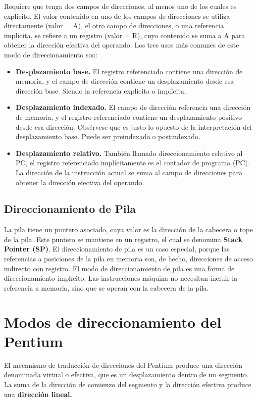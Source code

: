 \documentclass{article}
\begin{document}
Requiere que tenga dos campos de direcciones, al menos uno de los cuales
es expl\'{i}cito. El valor contenido en uno de los campos de direcciones
se utiliza directamente (valor = A), el otro campo de direcciones, o una
referencia impl\'{i}cita, se refiere a un registro (valor = R), cuyo contenido
se suma a A para obtener la direcci\'{o}n efectiva del operando. Los tres usos
m\'{a}s comunes de este modo de direccionamiento son:

\begin{itemize}
    \item \textbf{Desplazamiento base.}
          El registro referenciado contiene una direcci\'{o}n de memoria, y
          el campo de direcci\'{o}n contiene un desplazamiento desde esa
          direcci\'{o}n base. Siendo la referencia expl\'{i}cita o impl\'{i}cita.
    \item \textbf{Desplazamiento indexado.}
          El campo de direcci\'{o}n referencia una direcci\'{o}n de memoria,
          y el registro referenciado contiene un desplazamiento positivo desde
          esa direcci\'{o}n. Obs\'{e}rvese que es justo lo opuesto de la
          interpretaci\'{o}n del desplazamiento base. Puede ser preindexado o
          postindexado.
    \item \textbf{Desplazamiento relativo.}
          Tambi\'{e}n llamado direccionamiento relativo al PC, el registro
          referenciado impl\'{i}citamente es el contador de programa (PC).
          La direcci\'{o}n de la instrucci\'{o}n actual se suma al campo de
          direcciones para obtener la direcci\'{o}n efectiva del operando.
\end{itemize}

\subsection*{Direccionamiento de Pila}
La pila tiene un puntero asociado, cuya valor es la direcci\'{o}n de la cabecera
o tope de la pila. Este puntero se mantiene en un registro, el cual se denomina
\textbf{Stack Pointer (SP)}. El direccionamiento de pila es un caso especial,
porque las referencias a posiciones de la pila en memoria son, de hecho,
direcciones de acceso indirecto con registro. El modo de direccionamiento de
pila es una forma de direccionamiento impl\'{i}cito. Las instrucciones m\'{a}quina
no necesitan incluir la referencia a memoria, sino que se operan con la cabecera
de la pila.

\section*{Modos de direccionamiento del Pentium}
El mecanismo de traducci\'{o}n de direcciones del Pentium produce una direcci\'{o}n
denominada virtual o efectiva, que es un desplazamiento dentro de un segmento.
La suma de la direcci\'{o}n de comienzo del segmento y la direcci\'{o}n efectiva
produce una \textbf{direcci\'{o}n lineal.}
\end{document}
